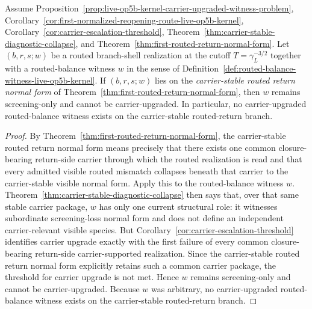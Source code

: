 \begin{proposition}
\label{prop:carrier-stable-routed-returns-prevent-routed-balance-witness-escalation}
Assume Proposition~\ref{prop:live-op5b-kernel-carrier-upgraded-witness-problem}, Corollary~\ref{cor:first-normalized-reopening-route-live-op5b-kernel}, Corollary~\ref{cor:carrier-escalation-threshold}, Theorem~\ref{thm:carrier-stable-diagnostic-collapse}, and Theorem~\ref{thm:first-routed-return-normal-form}. Let $(b,r,s;w)$ be a routed branch-shell realization at the cutoff \(T=\gamma_L^{-3/2}\) together with a routed-balance witness \(w\) in the sense of Definition~\ref{def:routed-balance-witness-live-op5b-kernel}. If $(b,r,s;w)$ lies on the \emph{carrier-stable routed return normal form} of Theorem~\ref{thm:first-routed-return-normal-form}, then \(w\) remains screening-only and cannot be carrier-upgraded. In particular, no carrier-upgraded routed-balance witness exists on the carrier-stable routed-return branch.
\end{proposition}

\begin{proof}
By Theorem~\ref{thm:first-routed-return-normal-form}, the carrier-stable routed return normal form means precisely that there exists one common closure-bearing return-side carrier through which the routed realization is read and that every admitted visible routed mismatch collapses beneath that carrier to the carrier-stable visible normal form. Apply this to the routed-balance witness \(w\). Theorem~\ref{thm:carrier-stable-diagnostic-collapse} then says that, over that same stable carrier package, \(w\) has only one current structural role: it witnesses subordinate screening-loss normal form and does not define an independent carrier-relevant visible species. But Corollary~\ref{cor:carrier-escalation-threshold} identifies carrier upgrade exactly with the first failure of every common closure-bearing return-side carrier-supported realization. Since the carrier-stable routed return normal form explicitly retains such a common carrier package, the threshold for carrier upgrade is not met. Hence \(w\) remains screening-only and cannot be carrier-upgraded. Because \(w\) was arbitrary, no carrier-upgraded routed-balance witness exists on the carrier-stable routed-return branch.
\end{proof}

